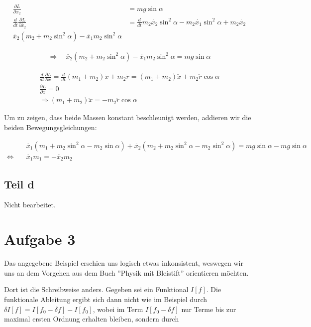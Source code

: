 \documentclass[a4paper,german,12pt,smallheadings]{scrartcl}
\begin{document}
\begin{align*}
  \frac{\partial L}{\partial x_2} &= mg \sin \alpha \\
  \frac{d}{dt}\frac{\partial L}{\partial \dot{x_2}} &= \frac{d}{dt} m_2\dot{x_2} \sin^2 \alpha - m_2 \dot{x_1} \sin^2 \alpha + m_2\dot{x_2} \\
  \ddot{x_2}(m_2+m_2 \sin^2 \alpha) - \ddot{x_1} m_2 \sin^2 \alpha
\end{align*}

\begin{align*}
  \Rightarrow\quad \ddot{x_2}(m_2+m_2 \sin^2 \alpha) - \ddot{x_1} m_2 \sin^2 \alpha = mg \sin \alpha
\end{align*}

\begin{align}
  \frac{d}{dt}\frac{\partial L}{\partial \dot{x}} = \frac{d}{dt} (m_1+m_2)\dot{x} + m_2\dot{r} = (m_1+m_2)\ddot{x} + m_2\ddot{r} \cos \alpha \\
  \frac{\partial L}{\partial x} = 0 \\
  \Rightarrow (m_1+m_2)\ddot{x} = -m_2 \ddot{r} \cos \alpha
  \label{x_component}
\end{align}

Um zu zeigen, dass beide Massen konstant beschleunigt werden, addieren wir die beiden Bewegungsgleichungen:

\begin{align*}
&\ddot{x_1}(m_1+m_2 \sin^2 \alpha -m_2 \sin \alpha)+\ddot{x_2}(m_2+m_2 \sin^2 \alpha - m_2 \sin^2 \alpha)=mg \sin \alpha - mg \sin \alpha \\
\Leftrightarrow\quad & \ddot{x_1} m_1 = -\ddot{x_2} m_2
\end{align*}

\subsection*{Teil d}
Nicht bearbeitet.

\section*{Aufgabe 3}
Das angegebene Beispiel erschien uns logisch etwas inkonsistent, weswegen wir
uns an dem Vorgehen aus dem Buch ''Physik mit Bleistift'' orientieren möchten.

Dort ist die Schreibweise anders. Gegeben sei ein Funktional $I[f]$. Die
funktionale Ableitung ergibt sich dann nicht wie im Beispiel durch $\delta I[f]
= I[f_0 - \delta f] - I[f_0]$, wobei im Term $I[f_0 - \delta f]$ nur Terme bis
zur maximal ersten Ordnung erhalten bleiben, sondern durch
\end{document}
